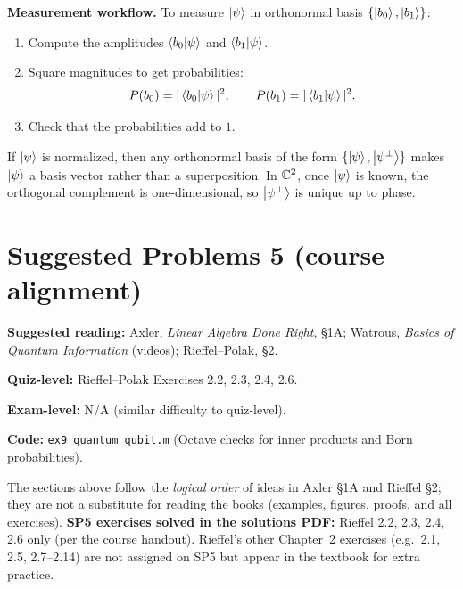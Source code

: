 \textbf{Measurement workflow.} To measure $\left|\psi\right\rangle$ in orthonormal basis $\{\left|b_0\right\rangle,\left|b_1\right\rangle\}$:
\begin{enumerate}
  \item Compute the amplitudes $\left\langle b_0\middle|\psi\right\rangle$ and $\left\langle b_1\middle|\psi\right\rangle$.
  \item Square magnitudes to get probabilities:
  \[
  P(b_0)=|\left\langle b_0\middle|\psi\right\rangle|^2,
  \qquad
  P(b_1)=|\left\langle b_1\middle|\psi\right\rangle|^2.
  \]
  \item Check that the probabilities add to $1$.
\end{enumerate}

\begin{remark}
If $\left|\psi\right\rangle$ is normalized, then any orthonormal basis of the form $\{\left|\psi\right\rangle,\left|\psi^\perp\right\rangle\}$ makes $\left|\psi\right\rangle$ a basis vector rather than a superposition. In $\mathbb{C}^2$, once $\left|\psi\right\rangle$ is known, the orthogonal complement is one-dimensional, so $\left|\psi^\perp\right\rangle$ is unique up to phase.
\end{remark}

\section{Suggested Problems 5 (course alignment)}

\noindent\textbf{Suggested reading:} Axler, \textit{Linear Algebra Done Right}, \S1A; Watrous, \textit{Basics of Quantum Information} (videos); Rieffel--Polak, \S2.

\noindent\textbf{Quiz-level:} Rieffel--Polak Exercises 2.2, 2.3, 2.4, 2.6.

\noindent\textbf{Exam-level:} N/A (similar difficulty to quiz-level).

\noindent\textbf{Code:} \texttt{ex9\_quantum\_qubit.m} (Octave checks for inner products and Born probabilities).

\begin{remark}
The sections above follow the \emph{logical order} of ideas in Axler \S1A and Rieffel \S2; they are not a substitute for reading the books (examples, figures, proofs, and all exercises). \textbf{SP5 exercises solved in the solutions PDF:} Rieffel 2.2, 2.3, 2.4, 2.6 only (per the course handout). Rieffel's other Chapter~2 exercises (e.g.\ 2.1, 2.5, 2.7--2.14) are not assigned on SP5 but appear in the textbook for extra practice.
\end{remark}
